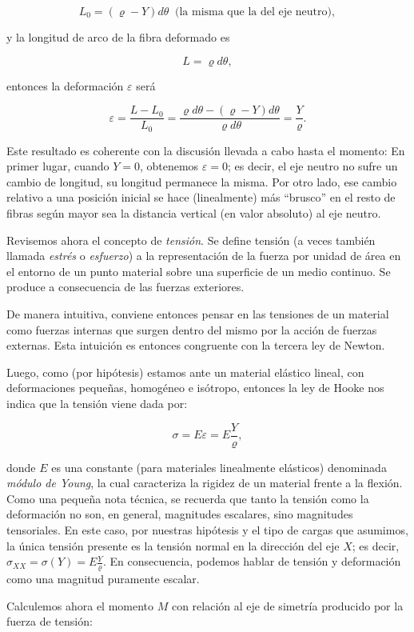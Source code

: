 \[L_0 = (\varrho - Y)d\theta \ \text{ (la misma que la del eje neutro)},\]

y la longitud de arco de la fibra deformado es

\[L = \varrho d\theta,\]

entonces la deformación $\varepsilon$ será

\[\varepsilon = \frac{L - L_0}{L_0} = \frac{\varrho d\theta - (\varrho - Y)d\theta}{\varrho d\theta} = \frac{Y}{\varrho}.\]

Este resultado es coherente con la discusión llevada a cabo hasta el momento: En primer lugar, cuando $Y = 0$, obtenemos $\varepsilon = 0$; es decir, el eje neutro no sufre un cambio de longitud, su longitud permanece la misma. Por otro lado, ese cambio relativo a una posición inicial se hace (linealmente) más ``brusco'' en el resto de fibras según mayor sea la distancia vertical (en valor absoluto) al eje neutro.

Revisemos ahora el concepto de \textit{tensión}. Se define tensión (a veces también llamada \textit{estrés} o \textit{esfuerzo}) a la representación de la fuerza por unidad de área en el entorno de un punto material sobre una superficie de un medio continuo. Se produce a consecuencia de las fuerzas exteriores.

De manera intuitiva, conviene entonces pensar en las tensiones de un material como fuerzas internas que surgen dentro del mismo por la acción de fuerzas externas. Esta intuición es entonces congruente con la tercera ley de Newton.

Luego, como (por hipótesis) estamos ante un material elástico lineal, con deformaciones pequeñas, homogéneo e isótropo, entonces la ley de Hooke nos indica que la tensión viene dada por:

\[\sigma = E \varepsilon = E \frac{Y}{\varrho},\]

donde $E$ es una constante (para materiales linealmente elásticos) denominada \textit{módulo de Young}, la cual caracteriza la rigidez de un material frente a la flexión. Como una pequeña nota técnica, se recuerda que tanto la tensión como la deformación no son, en general, magnitudes escalares, sino magnitudes tensoriales. En este caso, por nuestras hipótesis y el tipo de cargas que asumimos, la única tensión presente es la tensión normal en la dirección del eje $X$; es decir, $\sigma_{XX} = \sigma(Y) = E \frac{Y}{\varrho}$. En consecuencia, podemos hablar de tensión y deformación como una magnitud puramente escalar.

Calculemos ahora el momento $M$ con relación al eje de simetría producido por la fuerza de tensión:

